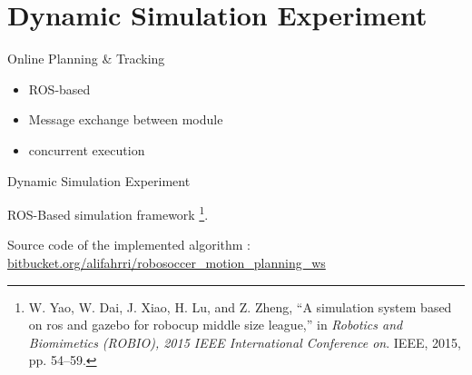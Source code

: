 \documentclass{beamer}
\begin{document}
\section{Dynamic Simulation Experiment}

\begin{frame}{Online Planning \& Tracking}

\centering
{}%

\begin{itemize}
\item ROS-based
\item Message exchange between module
\item concurrent execution
\end{itemize}

\end{frame}

\begin{frame}{Dynamic Simulation Experiment}

ROS-Based simulation framework \footnote{W. Yao, W. Dai, J. Xiao, H. Lu, and Z. Zheng, “A simulation system based on ros and gazebo for robocup middle size league,” in \emph{Robotics and Biomimetics (ROBIO), 2015 IEEE International Conference on}. IEEE, 2015,
pp. 54–59.}.

Source code of the implemented algorithm : \url{bitbucket.org/alifahrri/robosoccer_motion_planning_ws}

\vskip 0.25cm
\centering
{}

\end{frame}
\end{document}
